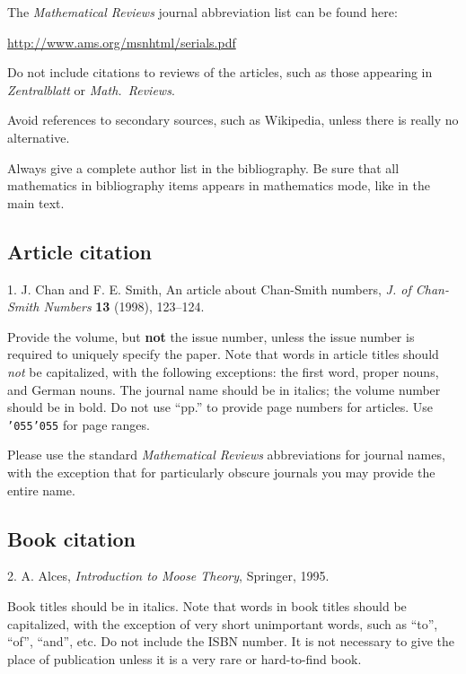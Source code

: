 \documentclass[12pt]{article}
\begin{document}
     The {\it Mathematical Reviews} journal abbreviation list can be
found here:

\centerline{\url{http://www.ams.org/msnhtml/serials.pdf}}

     Do not include citations to reviews of the articles, such as those
appearing in {\it Zentralblatt} or {\it Math.\ Reviews}.

     Avoid references to secondary sources, such as Wikipedia, unless
there is really no alternative.

Always give a complete author list in the bibliography.  Be sure that
all mathematics in bibliography items appears in mathematics mode, like
in the main text.

\subsection{Article citation}

    1.  J. Chan and F. E. Smith, An article about Chan-Smith numbers,
    {\it J. of Chan-Smith Numbers} {\bf 13} (1998), 123--124.

\smallskip

Provide the volume, but {\bf not} the issue number, unless the issue
number is required to uniquely specify the paper.  Note that words in article
titles should {\it not\/} be capitalized, with the following exceptions:
the first word, proper nouns, and German nouns.    The journal name should
be in italics; the volume number should be in bold.  Do not use ``pp.'' to
provide page numbers for articles.   Use {\tt \char'055\char'055}
for page ranges.

Please use the standard {\it Mathematical Reviews}
abbreviations for journal names, with the exception that for particularly
obscure journals you may provide the entire name.

\subsection{Book citation}

    2.  A. Alces, {\it Introduction to Moose Theory}, Springer, 1995.

\smallskip

Book titles should be in italics.
Note that words in book titles should be capitalized, with the exception of
very short unimportant words, such as ``to'', ``of'', ``and'', etc.
Do not include the ISBN number.  It is not necessary to give the place
of publication unless it is a very rare or hard-to-find book.
\end{document}
